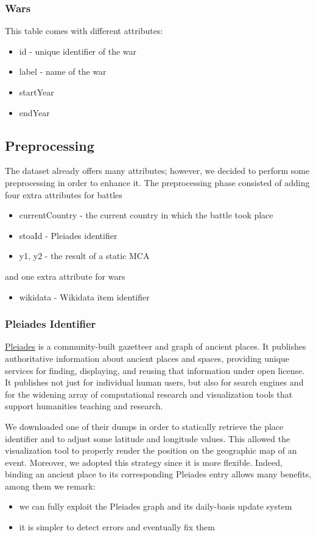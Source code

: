 \subsubsection{Wars}
This table comes with different attributes:
\begin{itemize}
    \item id - unique identifier of the war
    \item label - name of the war
    \item startYear
    \item endYear
\end{itemize}

\subsection{Preprocessing}
The dataset already offers many attributes; however, we decided to perform some preprocessing in order to enhance it. The preprocessing phase consisted of adding four extra attributes for battles
\begin{itemize}
    \item currentCountry - the current country in which the battle took place
    \item stoaId - Pleiades identifier
    \item y1, y2 - the result of a static MCA
\end{itemize}

and one extra attribute for wars
\begin{itemize}
    \item wikidata - Wikidata item identifier
\end{itemize}

\subsubsection{Pleiades Identifier}
\href{https://pleiades.stoa.org}{Pleiades} is a community-built gazetteer and graph of ancient places. It publishes authoritative information about ancient places and spaces, providing unique services for finding, displaying, and reusing that information under open license. It publishes not just for individual human users, but also for search engines and for the widening array of computational research and visualization tools that support humanities teaching and research.

We downloaded one of their dumps in order to statically retrieve the place identifier and to adjust some latitude and longitude values. This allowed the visualization tool to properly render the position on the geographic map of an event. Moreover, we adopted this strategy since it is more flexible. Indeed, binding an ancient place to its corresponding Pleiades entry allows many benefits, among them we remark:
\begin{itemize}
    \item we can fully exploit the Pleiades graph and its daily-basis update system
    \item it is simpler to detect errors and eventually fix them
\end{itemize}

